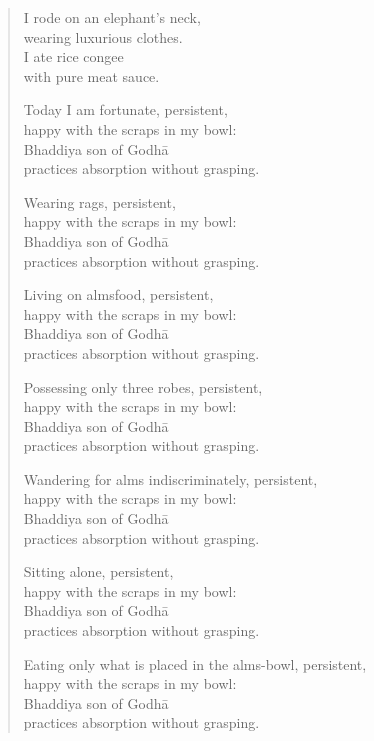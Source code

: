 \documentclass[12pt,openany]{book}%
\begin{document}
\begin{verse}%
I rode on an elephant’s neck, \\
wearing luxurious clothes. \\
I ate rice congee \\
with pure meat sauce. 

Today I am fortunate, persistent, \\
happy with the scraps in my bowl: \\
Bhaddiya son of \textsanskrit{Godhā} \\
practices absorption without grasping. 

Wearing rags, persistent, \\
happy with the scraps in my bowl: \\
Bhaddiya son of \textsanskrit{Godhā} \\
practices absorption without grasping. 

Living on almsfood, persistent, \\
happy with the scraps in my bowl: \\
Bhaddiya son of \textsanskrit{Godhā} \\
practices absorption without grasping. 

Possessing only three robes, persistent, \\
happy with the scraps in my bowl: \\
Bhaddiya son of \textsanskrit{Godhā} \\
practices absorption without grasping. 

Wandering for alms indiscriminately, persistent, \\
happy with the scraps in my bowl: \\
Bhaddiya son of \textsanskrit{Godhā} \\
practices absorption without grasping. 

Sitting alone, persistent, \\
happy with the scraps in my bowl: \\
Bhaddiya son of \textsanskrit{Godhā} \\
practices absorption without grasping. 

Eating only what is placed in the alms-bowl, persistent, \\
happy with the scraps in my bowl: \\
Bhaddiya son of \textsanskrit{Godhā} \\
practices absorption without grasping. 


\end{verse}
\end{document}
